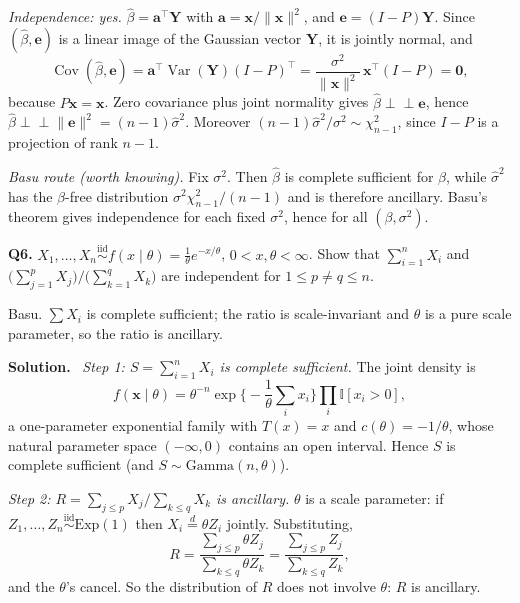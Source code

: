 \documentclass[11pt]{article}
\newcommand{\Var}{\operatorname{Var}}
\newcommand{\Cov}{\operatorname{Cov}}
\newcommand{\iid}{\overset{\text{iid}}{\sim}}
\newcommand{\ind}{\perp\!\!\!\perp}
\newenvironment{prob}[1]{\medskip\noindent\textbf{\large #1}\quad}{\par}
\newcommand{\soln}{\medskip\noindent\textbf{Solution.}\ }
\begin{document}
\emph{Independence: yes.} $\hat\beta=\mathbf{a}^{\!\top}\mathbf{Y}$ with
$\mathbf{a}=\mathbf{x}/\|\mathbf{x}\|^2$, and $\mathbf{e}=(I-P)\mathbf{Y}$. Since
$(\hat\beta,\mathbf{e})$ is a linear image of the Gaussian vector $\mathbf{Y}$, it is jointly
normal, and
\[
\Cov(\hat\beta,\mathbf{e})=\mathbf{a}^{\!\top}\Var(\mathbf{Y})(I-P)^{\!\top}
=\frac{\sigma^2}{\|\mathbf{x}\|^2}\,\mathbf{x}^{\!\top}(I-P)=\mathbf{0},
\]
because $P\mathbf{x}=\mathbf{x}$. Zero covariance plus joint normality gives
$\hat\beta\ind\mathbf{e}$, hence $\hat\beta\ind\|\mathbf{e}\|^2=(n-1)\hat\sigma^2$.
Moreover $(n-1)\hat\sigma^2/\sigma^2\sim\chi^2_{n-1}$, since $I-P$ is a projection of rank
$n-1$.

\emph{Basu route (worth knowing).} Fix $\sigma^2$. Then $\hat\beta$ is complete sufficient for
$\beta$, while $\hat\sigma^2$ has the $\beta$-free distribution $\sigma^2\chi^2_{n-1}/(n-1)$
and is therefore ancillary. Basu's theorem gives independence for each fixed $\sigma^2$, hence
for all $(\beta,\sigma^2)$.

\bigskip
\begin{prob}{Q6.}
$X_1,\dots,X_n\iid f(x\mid\theta)=\tfrac1\theta e^{-x/\theta}$, $0<x,\theta<\infty$. Show that
$\displaystyle\sum_{i=1}^n X_i$ and $\displaystyle\Big(\sum_{j=1}^p X_j\Big)\Big/\Big(\sum_{k=1}^q X_k\Big)$
are independent for $1\le p\ne q\le n$.
\end{prob}

\begin{ideabox}
Basu. $\sum X_i$ is complete sufficient; the ratio is scale-invariant and $\theta$ is a pure
scale parameter, so the ratio is ancillary.
\end{ideabox}

\soln
\emph{Step 1: $S=\sum_{i=1}^nX_i$ is complete sufficient.} The joint density is
\[
f(\mathbf{x}\mid\theta)=\theta^{-n}\exp\Big\{-\frac1\theta\sum_i x_i\Big\}
\prod_i\mathbb{I}[x_i>0],
\]
a one-parameter exponential family with $T(x)=x$ and $c(\theta)=-1/\theta$, whose natural
parameter space $(-\infty,0)$ contains an open interval. Hence $S$ is complete sufficient
(and $S\sim\mathrm{Gamma}(n,\theta)$).

\emph{Step 2: $R=\sum_{j\le p}X_j\big/\sum_{k\le q}X_k$ is ancillary.} $\theta$ is a scale
parameter: if $Z_1,\dots,Z_n\iid\mathrm{Exp}(1)$ then $X_i\overset{d}{=}\theta Z_i$ jointly.
Substituting,
\[
R=\frac{\sum_{j\le p}\theta Z_j}{\sum_{k\le q}\theta Z_k}
=\frac{\sum_{j\le p}Z_j}{\sum_{k\le q}Z_k},
\]
and the $\theta$'s cancel. So the distribution of $R$ does not involve $\theta$: $R$ is
ancillary.
\end{document}
